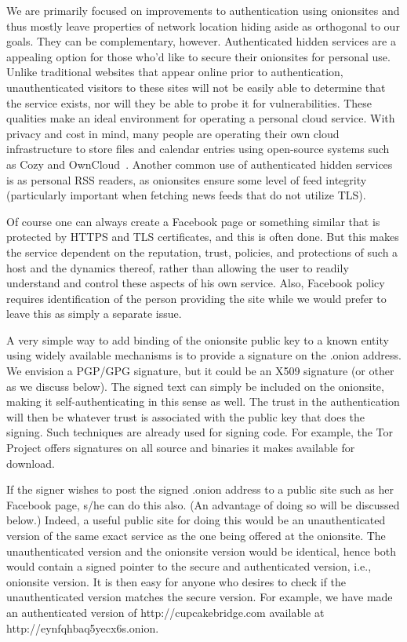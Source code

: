 \documentclass[10pt, conference, compsocconf]{styles/IEEEtran}
\begin{document}
We are primarily focused on improvements to authentication using
onionsites and thus mostly leave properties of network location hiding
aside as orthogonal to our goals. They can be complementary, however.
Authenticated hidden services are a appealing option for those
who'd like to secure their onionsites for personal use.  Unlike
traditional websites that appear online prior to authentication,
unauthenticated visitors to these sites will not be easily able to
determine that the service exists, nor will they be able to probe it
for vulnerabilities.  These qualities make an ideal environment for
operating a personal cloud service.  With privacy and cost in mind,
many people are operating their own cloud infrastructure to store
files and calendar entries using open-source systems such as Cozy and
OwnCloud~\cite{cozy}.  Another common use of authenticated hidden
services is as personal RSS readers, as onionsites ensure some level
of feed integrity (particularly important when fetching news feeds
that do not utilize TLS).

Of course one can always create a Facebook page or something similar
that is protected by HTTPS and TLS certificates,
and this is often done.  But this makes the service dependent on the
reputation, trust, policies, and protections of such a host and the
dynamics thereof, rather than allowing the user to readily understand
and control these aspects of his own service. Also, Facebook
policy requires identification of the person providing the site
while we would prefer to leave this as simply a separate issue.

A very simple way to add binding of the onionsite public key to
a known entity using widely available mechanisms is to provide a
signature on the .onion address. We envision a PGP/GPG signature, but
it could be an X509 signature (or other as we discuss below). 
The signed text can simply be
included on the onionsite, making it self-authenticating in this sense
as well. The trust in the authentication will then be whatever trust
is associated with the public key that does the signing. Such
techniques are already used for signing code. For example,
the Tor Project offers signatures on all source and binaries
it makes available for download. 

If the signer wishes to post the signed .onion address to a public
site such as her Facebook page, s/he can do this also. (An advantage
of doing so will be discussed below.) Indeed, a
useful public site for doing this would be an unauthenticated version
of the same exact service as the one being offered at the onionsite.
The unauthenticated version and the onionsite version would be
identical, hence both would contain a signed pointer to the secure and
authenticated version, i.e., onionsite version. It is then
easy for anyone who desires to check if the unauthenticated version
matches the secure version. For example, we have made an authenticated
version of http://cupcakebridge.com available at http://eynfqhbaq5yecx6s.onion.
\end{document}
